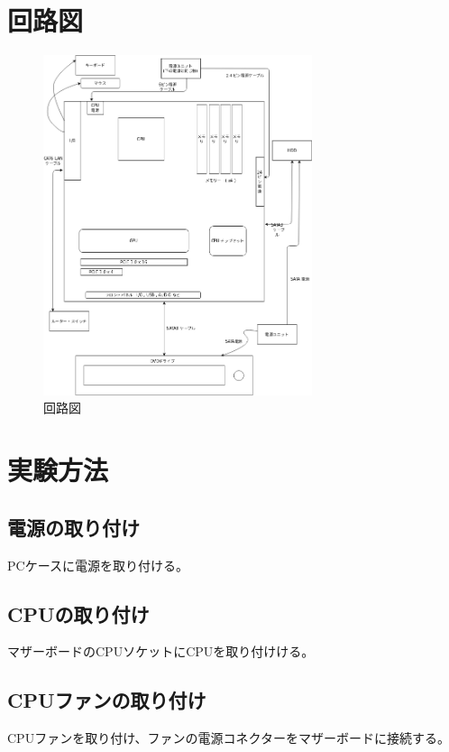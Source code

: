 \documentclass[10pt]{article}
\begin{document}
	\section{回路図}
		\begin{figure}[H]
			\centering
			\includegraphics[width=0.704\textwidth]{pc.png}
			\caption{回路図}
		\end{figure}
	\section{実験方法}
		\subsection{電源の取り付け}
			\hspace{1cm} PCケースに電源を取り付ける。
		\subsection{CPUの取り付け}
			\hspace{1cm} マザーボードのCPUソケットにCPUを取り付けける。

\subsection{CPUファンの取り付け}
\hspace{1cm} CPUファンを取り付け、ファンの電源コネクターをマザーボードに接続する。			
\end{document}
